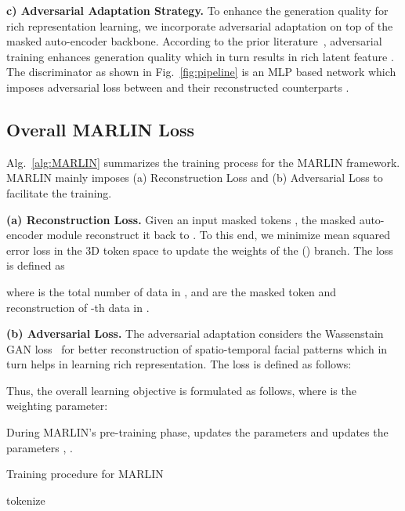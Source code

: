 \documentclass[10pt,twocolumn,letterpaper]{article}
\newcommand{\encoder}{}
\newcommand{\decoder}{}
\newcommand{\discriminator}{}
\newcommand{\fasking}{}
\begin{document}
\noindent \textbf{c) Adversarial Adaptation Strategy.} To enhance the generation quality for rich representation learning, we incorporate adversarial adaptation on top of the masked auto-encoder backbone. According to the prior literature~\cite{radfordUnsupervised2016, donahueLarge2019}, adversarial training enhances generation quality which in turn results in rich latent feature . The discriminator \discriminator as shown in Fig.~\ref{fig:pipeline} is an MLP based network which imposes adversarial loss  between  and their reconstructed counterparts .

\subsection{Overall MARLIN Loss}
Alg.~\ref{alg:MARLIN} summarizes the training process for the MARLIN framework. MARLIN mainly imposes (a) Reconstruction Loss and (b) Adversarial Loss to facilitate the training. 

\noindent \textbf{(a) Reconstruction Loss.} Given an input masked tokens , the masked auto-encoder module reconstruct it back to . To this end, we minimize mean squared error loss in the 3D token space to update the weights of the (\discriminator \encoder  \fasking ) branch. The loss is defined as 

 
where  is the total number of data in ,  and  are the masked token and reconstruction of -th data in .

\noindent \textbf{(b) Adversarial Loss.} The adversarial adaptation considers the Wassenstain GAN loss~\cite{arjovskyWasserstein2017} for better reconstruction of spatio-temporal facial patterns which in turn helps in learning rich representation. The loss is defined as follows: 



\noindent Thus, the overall learning objective  is formulated as follows, where  is the weighting parameter: 

 During MARLIN's pre-training phase,  updates the parameters  and  updates the parameters , .

\begin{algorithm}[tb]
\caption{Training procedure for MARLIN}
\label{alg:MARLIN}
\begin{algorithmic}[1]
\Require{\fasking, \encoder, \decoder, \discriminator, , , , }
 
\State 
\State  {}
\State  \Comment{Train \discriminator}
\State 
\State  \Comment{Train \encoder, \decoder}
\State 
\EndWhile
{} 
\State 
\State  tokenize 
\State  {}
 
    \State 
\Else {}
    \State 
\EndIf
\EndWhile
\end{algorithmic}
\end{algorithm}
\end{document}
